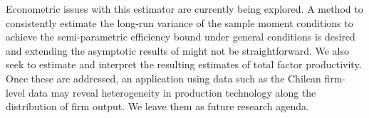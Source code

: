 \documentclass[11pt]{article}
\begin{document}
Econometric issues with this estimator are currently being explored. A method to consistently estimate the long-run variance of the sample moment conditions to achieve the semi-parametric efficiency bound under general conditions is desired and extending the asymptotic results of \cite*{qgmm} might not be straightforward. We also seek to estimate and interpret the resulting estimates of total factor productivity. Once these are addressed, an application using data such as the Chilean firm-level data may reveal heterogeneity in production technology along the distribution of firm output. 
We leave them as future research agenda.


\pagebreak
\newpage











\end{document}
